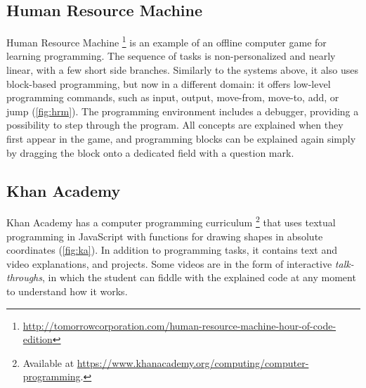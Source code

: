 \subsection{Human Resource Machine}
\label{sec:human-resource-machine}
Human Resource Machine%
\footnote{\url{http://tomorrowcorporation.com/human-resource-machine-hour-of-code-edition}}
is an example of an offline computer game for learning programming.
The sequence of tasks is non-personalized and nearly linear,
with a few short side branches.
Similarly to the systems above, it also uses block-based programming,
but now in a different domain:
it offers low-level programming commands, such as
input, output, move-from, move-to, add, or jump
(\cref{fig:hrm}).
The programming environment includes a debugger,
providing a possibility to step through the program.
All concepts are explained when they first appear in the game,
and programming blocks can
be explained again simply by dragging the block onto a dedicated field with a question
mark.


\subsection{Khan Academy}
\label{sec:khan-academy}
Khan Academy has a computer programming curriculum%
\footnote{Available at \url{https://www.khanacademy.org/computing/computer-programming}.}
that uses textual programming in JavaScript with functions for drawing shapes
in absolute coordinates %
(\cref{fig:ka}).
In addition to programming tasks, it contains text and video explanations, and
projects. Some videos are in the form of interactive \emph{talk-throughs},
in which the student can fiddle with the explained code at any moment to understand
how it works.



